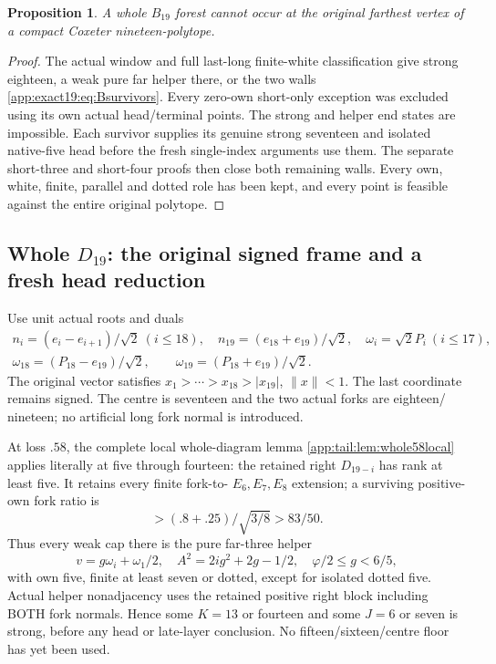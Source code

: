 \documentclass[11pt]{article}
\newtheorem{proposition}[theorem]{Proposition}
\theoremstyle{definition}
\theoremstyle{remark}
\begin{document}
\begin{proposition}\label{app:exact19:prop:wholeB19}
A whole \(B_{19}\) forest cannot
occur at the original farthest
vertex of a compact Coxeter
nineteen-polytope.
\end{proposition}
\begin{proof}
The actual window and full
last-long finite-white classification
give strong eighteen, a weak pure
far helper there, or the two walls
\eqref{app:exact19:eq:Bsurvivors}.
Every zero-own short-only
exception was excluded using its
own actual head/terminal points.
The strong and helper end states
are impossible.
Each survivor supplies its genuine
strong seventeen and isolated
native-five head before the fresh
single-index arguments use them.
The separate short-three and
short-four proofs then close both
remaining walls.
Every own, white, finite, parallel
and dotted role has been kept,
and every point is feasible against
the entire original polytope.
\end{proof}

\subsection{Whole \(D_{19}\): the original signed frame and a fresh head reduction}
\label{app:exact19:Dhead}

Use unit actual roots and duals
\[
\begin{gathered}
 n_i=(e_i-e_{i+1})/\sqrt2\ (i\le18),\quad
 n_{19}=(e_{18}+e_{19})/\sqrt2,\quad
 \omega_i=\sqrt2P_i\ (i\le17),\\
 \omega_{18}=(P_{18}-e_{19})/\sqrt2,\qquad
 \omega_{19}=(P_{18}+e_{19})/\sqrt2 .
\end{gathered}
\]
The original vector satisfies
\(x_1>\cdots>x_{18}>|x_{19}|\),
\(\|x\|<1\).
The last coordinate remains signed.
The centre is seventeen and the
two actual forks are eighteen/
nineteen; no artificial long
fork normal is introduced.

At loss \(.58\), the complete local
whole-diagram lemma
\ref{app:tail:lem:whole58local}
applies literally at five through
fourteen: the retained right
\(D_{19-i}\) has rank at least five.
It retains every finite fork-to-
\(E_6,E_7,E_8\) extension;
a surviving positive-own fork
ratio is
\[
                >(.8+.25)/\sqrt{3/8}>83/50 .
\]
Thus every weak cap there is the
pure far-three helper
\[
        v=g\omega_i+\omega_1/2,\quad
        A^2=2ig^2+2g-1/2,\quad
        \varphi/2\le g<6/5 ,
\]
with own five, finite at least
seven or dotted, except for
isolated dotted five.
Actual helper nonadjacency uses
the retained positive right block
including BOTH fork normals.
Hence some \(K=13\) or fourteen
and some \(J=6\) or seven is strong,
before any head or late-layer
conclusion.
No fifteen/sixteen/centre floor
has yet been used.
\end{document}
